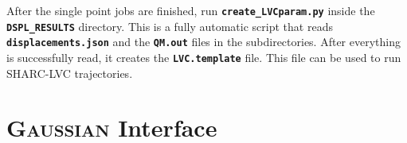 \documentclass[a4paper,10pt,DIV=15,openany]{scrbook}
\newcommand{\sharc}{\textsc{Sharc}}
\newcommand{\ttt}[1]{\textbf{\texttt{#1}}}
\newenvironment{example}{
  \setlength{\OuterFrameSep}{3pt}
  \vspace{0mm}
  \definecolor{shadecolor}{HTML}{E4F4FF}
  \begin{shaded}
}{
  \end{shaded}
}
\begin{document}
After the single point jobs are finished, run \ttt{create\_LVCparam.py} inside the \ttt{DSPL\_RESULTS} directory.
This is a fully automatic script that reads \ttt{displacements.json} and the \ttt{QM.out} files in the subdirectories.
After everything is successfully read, it creates the \ttt{LVC.template} file.
This file can be used to run SHARC-LVC trajectories.




% 
% 
% 
% 


\section{\textsc{Gaussian} Interface}\label{sec:int:gaussian}
\end{document}
